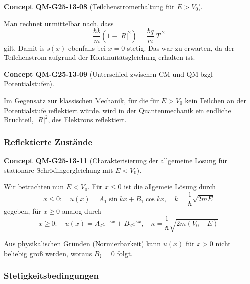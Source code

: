 \documentclass[10pt, letterpaper]{article}
\newcommand{\CustomHeading}[3]{%
  \par\medskip\noindent%
  \textbf{#1 #2} \textnormal{(#3)}.\enskip%
}
\newenvironment{CONC}[2]{\begin{unitbox}\CustomHeading{Concept}{#1}{#2}}{\end{unitbox}}
\begin{document}
\begin{CONC}{QM-G25-13-08}{Teilchenstromerhaltung für $E>V_0$}
Man rechnet unmittelbar nach, dass
$$
\frac{\hbar k}{m}\left(1-|R|^{2}\right)=\frac{\hbar q}{m}|T|^{2}
$$
gilt. Damit is $s(x)$ ebenfalls bei $x=0$ stetig. Das war zu erwarten, da der Teilchenstrom aufgrund der Kontinuitätsgleichung erhalten ist.
\end{CONC}

\begin{CONC}{QM-G25-13-09}{Unterschied zwischen CM und QM bzgl Potentialstufen}
Im Gegensatz zur klassischen Mechanik, für die für $E>V_{0}$ kein Teilchen an der Potentialstufe reflektiert würde, wird in der Quantenmechanik ein endliche Bruchteil, $|R|^{2}$, des Elektrons reflektiert.
\end{CONC}





\subsubsection{Reflektierte Zustände}


\begin{CONC}{QM-G25-13-11}{Charakterisierung der allgemeine Lösung für stationäre Schrödingergleichung mit $E<V_0$}
Wir betrachten nun $E<V_{0}$. Für $x \leq 0$ ist die allgemeie Lösung durch
$$
x \leq 0: \quad u(x)=A_{1} \sin k x+B_{1} \cos k x, \quad k=\frac{1}{\hbar} \sqrt{2 m E}
$$
gegeben, für $x \geq 0$ analog durch
$$
x \geq 0: \quad u(x)=A_{2} e^{-\kappa x}+B_{2} e^{\kappa x}, \quad \kappa=\frac{1}{\hbar} \sqrt{2 m\left(V_{0}-E\right)}
$$

Aus physikalischen Gründen (Normierbarkeit) kann $u(x)$ für $x>0$ nicht beliebig groß werden, woraus $B_{2}=0$ folgt.
\end{CONC}


\subsubsection*{Stetigkeitsbedingungen}
\end{document}
